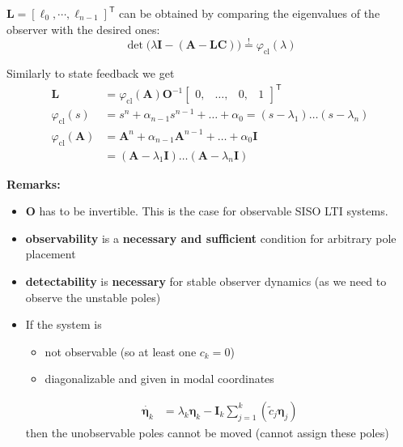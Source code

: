 $\mathbf{L}={\left[\ell_0,\cdots,\ell_{n-1}\right]}^{\mathsf{T}}$ can be obtained by comparing the eigenvalues of the observer with the desired ones:
\noindent\begin{equation*}
    \det\bigl(\lambda \mathbf{I} -(\mathbf{A}-\mathbf{LC})\bigr) \overset{!}{=} \varphi_{\mathrm{cl}}(\lambda)
\end{equation*}


Similarly to state feedback we get
\begin{align*}
    \mathbf{L}                        & =\varphi_{\mathrm{cl}}(\mathbf{A})\mathbf{O}^{-1}\begin{bmatrix}
                                                                                             0, & \ldots, & 0, & 1
                                                                                         \end{bmatrix}^{\mathsf{T}} \\
    \varphi_{\mathrm{cl}}(s)          & =s^n+\alpha_{n-1}s^{n-1}+\ldots+\alpha_0=(s-\lambda_1)\ldots(s-\lambda_n)   \\
    \varphi_{\mathrm{cl}}(\mathbf{A}) & =\mathbf{A}^n+\alpha_{n-1}\mathbf{A}^{n-1}+\ldots+\alpha_0 \mathbf{I}       \\
                                      & = (\mathbf{A}-\lambda_1 \mathbf{I})\ldots(\mathbf{A}-\lambda_n \mathbf{I})
\end{align*}

\textbf{Remarks:}
\begin{itemize}
    \item $\mathbf{O}$ has to be invertible. This is the case for observable SISO LTI systems.
    \item \textbf{observability} is a \textbf{necessary and sufficient} condition for arbitrary pole placement
    \item \textbf{detectability} is \textbf{necessary} for stable observer dynamics (as we need to observe the unstable poles)
    \item If the system is
          \begin{itemize}
              \item not observable (so at least one $c_k=0$)
              \item diagonalizable and given in modal coordinates
          \end{itemize}
          \begin{align*}
              \dot{\boldsymbol{\eta}_k} & =\lambda_k\boldsymbol{\eta}_k-\mathbf{I}_k\sum_{j=1}^k\left(\tilde{c}_j \boldsymbol{\eta}_j\right)
          \end{align*}
          then the unobservable poles cannot be moved (cannot assign these poles)
\end{itemize}

